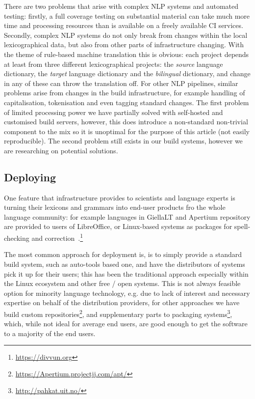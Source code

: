 \documentclass[free]{flammie}
\begin{document}
There are two problems that arise with complex NLP systems and automated testing: firstly, a full coverage testing on substantial material can take much more time and processing resources than is available on a freely available CI services.
Secondly, complex NLP systems do not only break from changes within the local lexicographical data, but also from other parts of infrastructure changing.
With the theme of rule-based machine translation this is obvious: each project depends at least from three different lexicographical projects: the \textit{source} language dictionary, the \textit{target} language dictionary and the \textit{bilingual} dictionary, and change in any of these can throw the translation off.
For other NLP pipelines, similar problems arise from changes in the build infrastructure, for example handling of capitalisation, tokenisation and even tagging standard changes.
The first problem of limited processing power we have partially solved with self-hosted and customised build servers, however, this does introduce a non-standard non-trivial component to the mix so it is unoptimal for the purpose of this article (not easily reproducible).
The second problem still exists in our build systems, however we are researching on potential solutions.


\subsection{Deploying}

One feature that infrastructure provides to scientists and language experts is turning their  lexicons and grammars into end-user products fro the whole language community: for example languages  in GiellaLT and Apertium repository are provided to users of LibreOffice, or Linux-based systems as packages for spell-checking and correction~\cite{pirinen2014state}.\footnote{\url{https://divvun.org}}

The most common approach for deployment is, is to simply provide a standard build system, such as auto-tools based one, and have the distributors of systems pick it up for their users; this has been the traditional approach especially within the Linux ecosystem and other free / open systems.
This is not always feasible option for minority language technology, e.g. due to lack of interest and necessary expertise on behalf of the distribution providers, for other approaches we have build custom repositories\footnote{\url{https://Apertium.projectjj.com/apt/}}, and supplementary parts to packaging systems\footnote{\url{http://pahkat.uit.no/}}, which, while not ideal for average end users, are good enough to get the software to a majority of the end users.
\end{document}
